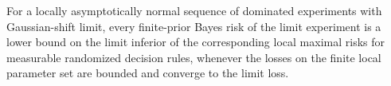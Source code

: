 For a locally asymptotically normal sequence of dominated experiments with Gaussian-shift limit, every finite-prior Bayes risk of the limit experiment is a lower bound on the limit inferior of the corresponding local maximal risks for measurable randomized decision rules, whenever the losses on the finite local parameter set are bounded and converge to the limit loss.